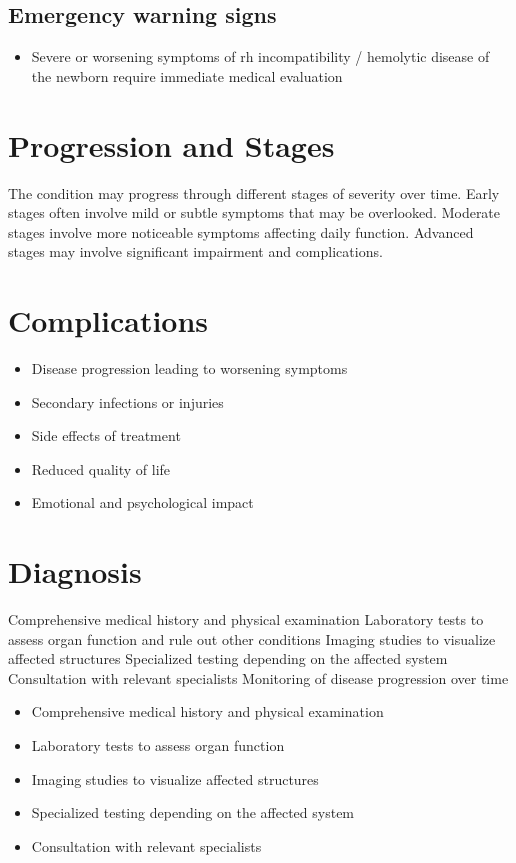 \subsection{Emergency warning signs}
\begin{itemize}[noitemsep]
  \item Severe or worsening symptoms of rh incompatibility / hemolytic disease of the newborn require immediate medical evaluation
\end{itemize}
\section{Progression and Stages}
The condition may progress through different stages of severity over time. Early stages often involve mild or subtle symptoms that may be overlooked. Moderate stages involve more noticeable symptoms affecting daily function. Advanced stages may involve significant impairment and complications.
\section{Complications}
\begin{itemize}[noitemsep]
  \item Disease progression leading to worsening symptoms
  \item Secondary infections or injuries
  \item Side effects of treatment
  \item Reduced quality of life
  \item Emotional and psychological impact
\end{itemize}
\section{Diagnosis}
Comprehensive medical history and physical examination Laboratory tests to assess organ function and rule out other conditions Imaging studies to visualize affected structures Specialized testing depending on the affected system Consultation with relevant specialists Monitoring of disease progression over time

\begin{itemize}[noitemsep]
  \item Comprehensive medical history and physical examination
  \item Laboratory tests to assess organ function
  \item Imaging studies to visualize affected structures
  \item Specialized testing depending on the affected system
  \item Consultation with relevant specialists
\end{itemize}
